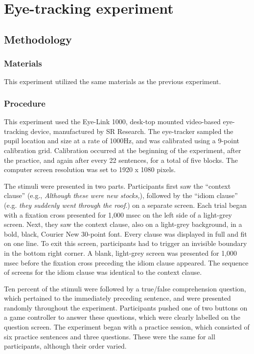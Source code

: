 \documentclass[output=paper,modfonts,nonflat]{langsci/langscibook}
\begin{document}



\section{Eye-tracking experiment}
\subsection{Methodology}

\subsubsection{Materials}
This experiment utilized the same materials as the previous experiment.


\subsubsection{Procedure}

This experiment used the Eye-Link 1000, desk-top mounted video-based eye-tracking device, manufactured by SR Research. The eye-tracker sampled the pupil location and size at a rate of 1000Hz, and was calibrated using a 9-point calibration grid. Calibration occurred at the beginning of the experiment, after the practice, and again after every 22 sentences, for a total of five blocks. The computer screen resolution was set to 1920 x 1080 pixels.

The stimuli were presented in two parts. Participants first saw the ``context clause'' (e.g., \textit{ Although these were new stocks,}), followed by the ``idiom clause'' (e.g. \textit{they suddenly went through the roof}.) on a separate screen. Each trial began with a fixation cross presented for 1,000 msec on the left side of a light-grey screen. Next, they saw the context clause, also on a light-grey background, in a bold, black, Courier New 30-point font. Every clause was displayed in full and fit on one line. To exit this screen, participants had to trigger an invisible boundary in the bottom right corner. A blank, light-grey screen was presented for 1,000 msec before the fixation cross preceding the idiom clause appeared. The sequence of screens for the idiom clause was identical to the context clause. 

Ten percent of the stimuli were followed by a true/false comprehension question, which pertained to the immediately preceding sentence, and were presented randomly throughout the experiment. Participants pushed one of two buttons on a game controller to answer these questions, which were clearly labelled on the question screen. The experiment began with a practice session, which consisted of six practice sentences and three questions. These were the same for all participants, although their order varied. 
\end{document}
